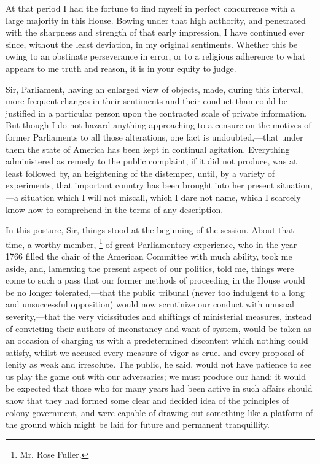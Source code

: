 At that period I had the fortune to find myself in perfect concurrence with a large majority in this House. Bowing under that high authority, and penetrated with the sharpness and strength of that early impression, I have continued ever since, without the least deviation, in my original sentiments. Whether this be owing to an obstinate perseverance in error, or to a religious adherence to what appears to me truth and reason, it is in your equity to judge.

Sir, Parliament, having an enlarged view of objects, made, during this interval, more frequent changes in their sentiments and their conduct than could be justified in a particular person upon the contracted scale of private information. But though I do not hazard anything approaching to a censure on the motives of former Parliaments to all those alterations, one fact is undoubted,—that under them the state of America has been kept in continual agitation. Everything administered as remedy to the public complaint, if it did not produce, was at least followed by, an heightening of the distemper, until, by a variety of experiments, that important country has been brought into her present situation,—a situation which I will not miscall, which I dare not name, which I scarcely know how to comprehend in the terms of any description.

In this posture, Sir, things stood at the beginning of the session. About that time, a worthy member,
\footnote{Mr. Rose Fuller.}
of great Parliamentary experience, who in the year 1766 filled the chair of the American Committee with much ability, took me aside, and, lamenting the present aspect of our politics, told me, things were come to such a pass that our former methods of proceeding in the House would be no longer tolerated,—that the public tribunal (never too indulgent to a long and unsuccessful opposition) would now scrutinize our conduct with unusual severity,—that the very vicissitudes and shiftings of ministerial measures, instead of convicting their authors of inconstancy and want of system, would be taken as an occasion of charging us with a predetermined discontent which nothing could satisfy, whilst we accused every measure of vigor as cruel and every proposal of lenity as weak and irresolute. The public, he said, would not have patience to see us play the game out with our adversaries; we must produce our hand: it would be expected that those who for many years had been active in such affairs should show that they had formed some clear and decided idea of the principles of colony government, and were capable of drawing out something like a platform of the ground which might be laid for future and permanent tranquillity.

